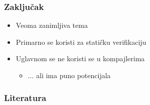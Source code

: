 \documentclass[xetex,mathserif,serif]{beamer}
\begin{document}
  \begin{frame}
    \frametitle{Zaključak}
	\begin{center}
		\begin{itemize}
 			\item Veoma zanimljiva tema \pause
			\item Primarno se koristi za statičku verifikaciju \pause
			\item Uglavnom se ne koristi se u kompajlerima \pause
			\begin{itemize}
				\item $\dots$ {\color{green} ali ima puno potencijala}
			\end{itemize}
			
		\end{itemize}
	\end{center}
  \end{frame}
    \begin{frame}
    \frametitle{Literatura}
	\begin{center}
	\end{center}
  \end{frame}
\end{document}
